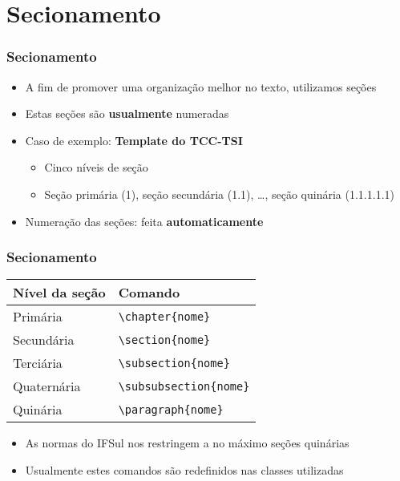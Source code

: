 \section{Secionamento}

\begin{frame}[fragile] \frametitle{Secionamento}
\begin{itemize}
	\item A fim de promover uma organização melhor no texto, utilizamos seções
	\item Estas seções são \textbf{usualmente} numeradas
	\item Caso de exemplo: \textbf{Template do TCC-TSI}
	\begin{itemize}
		\item Cinco níveis de seção
		\item Seção primária (1), seção secundária (1.1), \ldots, seção quinária (1.1.1.1.1)
	\end{itemize}
	\item Numeração das seções: feita \textbf{automaticamente}
\end{itemize}
\end{frame}

\begin{frame}[fragile] \frametitle{Secionamento}
\begin{table}[!t]
\centering
\begin{tabular}{l|l}
\hline
	\textbf{Nível da seção} & \textbf{Comando}                      \\ \hline
	Primária                & \texttt{\textbackslash{}chapter\{nome\}}       \\ \hline
	Secundária              & \texttt{\textbackslash{}section\{nome\}}       \\ \hline
	Terciária               & \texttt{\textbackslash{}subsection\{nome\}}    \\ \hline
	Quaternária             & \texttt{\textbackslash{}subsubsection\{nome\}} \\ \hline
	Quinária                & \texttt{\textbackslash{}paragraph\{nome\}}     \\ \hline
\end{tabular}
\end{table}

\begin{itemize}
	\item As normas do IFSul nos restringem a no máximo seções quinárias
	\item Usualmente estes comandos são redefinidos nas classes utilizadas
\end{itemize}
\end{frame}

